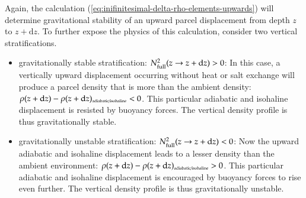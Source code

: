 Again, the calculation
(\ref{eq:inifinitesimal-delta-rho-elements-upwards}) will determine
gravitational stability of an upward parcel displacement from depth
$z$ to $z+\mathrm{d}z$.  To further expose the physics of this
calculation, consider two vertical stratifications.
\begin{itemize}
\item {\sc gravitationally stable stratification:
    $N^{2}_{\mbox{\scriptsize full}}(z \rightarrow z+\mathrm{d}z) >
    0$}: In this case, a vertically upward displacement occurring
  without heat or salt exchange will produce a parcel density that is
  more than the ambient density: $\rho(z+\mathrm{d} z) -
  \rho(z+\mathrm{d} z)_{\mbox{\tiny adiabatic/isohaline}} <0$. This
  particular adiabatic and isohaline displacement is resisted by
  buoyancy forces.  The vertical density profile is thus
  gravitationally stable.

\item {\sc gravitationally unstable stratification:
    $N^{2}_{\mbox{\scriptsize full}}(z \rightarrow z+\mathrm{d}z) <
    0$}: Now the upward adiabatic and isohaline displacement leads to
  a lesser density than the ambient environment: $\rho(z+\mathrm{d} z)
  - \rho(z+\mathrm{d} z)_{\mbox{\tiny adiabatic/isohaline}} >0$.  This
  particular adiabatic and isohaline displacement is encouraged by
  buoyancy forces to rise even further. The vertical density profile
  is thus gravitationally unstable.

\end{itemize}

